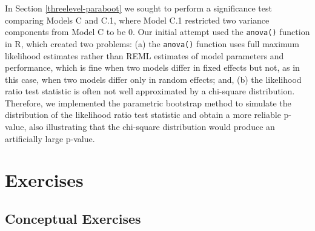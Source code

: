 \documentclass[
]{krantz}
\begin{document}
In Section \ref{threelevel-paraboot} we sought to perform a significance test comparing Models C and C.1, where Model C.1 restricted two variance components from Model C to be 0. Our initial attempt used the \texttt{anova()} function in R, which created two problems: (a) the \texttt{anova()} function uses full maximum likelihood estimates rather than REML estimates of model parameters and performance, which is fine when two models differ in fixed effects but not, as in this case, when two models differ only in random effects; and, (b) the likelihood ratio test statistic is often not well approximated by a chi-square distribution. Therefore, we implemented the parametric bootstrap method to simulate the distribution of the likelihood ratio test statistic and obtain a more reliable p-value, also illustrating that the chi-square distribution would produce an artificially large p-value.

\hypertarget{exercises-9}{%
\section{Exercises}\label{exercises-9}}

\hypertarget{conceptual-exercises-7}{%
\subsection{Conceptual Exercises}\label{conceptual-exercises-7}}
\end{document}
